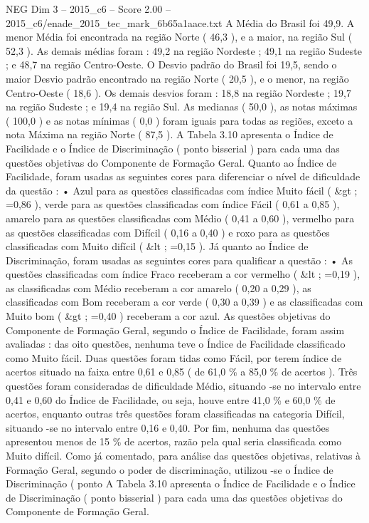 \begin{textsample}{NEG Dim 3 – 2015\_c6 – Score 2.00 – 2015\_c6/enade\_2015\_tec\_mark\_6b65a1aace.txt}
A Média do Brasil foi 49,9.
A menor Média foi encontrada na região Norte ( 46,3 ), e a maior, na região Sul ( 52,3 ).
As demais médias foram : 49,2 na região Nordeste ; 49,1 na região Sudeste ; e 48,7 na região Centro-Oeste.
O Desvio padrão do Brasil foi 19,5, sendo o maior Desvio padrão encontrado na região Norte ( 20,5 ), e o menor, na região Centro-Oeste ( 18,6 ).
Os demais desvios foram : 18,8 na região Nordeste ; 19,7 na região Sudeste ; e 19,4 na região Sul.
As medianas ( 50,0 ), as notas máximas ( 100,0 ) e as notas mínimas ( 0,0 ) foram iguais para todas as regiões, exceto a nota Máxima na região Norte ( 87,5 ).
A Tabela 3.10 apresenta o Índice de Facilidade e o Índice de Discriminação ( ponto bisserial ) para cada uma das questões objetivas do Componente de Formação Geral.
Quanto ao Índice de Facilidade, foram usadas as seguintes cores para diferenciar o nível de dificuldade da questão : • Azul para as questões classificadas com índice Muito fácil ( \&gt ; =0,86 ), verde para as questões classificadas com índice Fácil ( 0,61 a 0,85 ), amarelo para as questões classificadas com Médio ( 0,41 a 0,60 ), vermelho para as questões classificadas com Difícil ( 0,16 a 0,40 ) e roxo para as questões classificadas com Muito difícil ( \&lt ; =0,15 ).
Já quanto ao Índice de Discriminação, foram usadas as seguintes cores para qualificar a questão : • As questões classificadas com índice Fraco receberam a cor vermelho ( \&lt ; =0,19 ), as classificadas com Médio receberam a cor amarelo ( 0,20 a 0,29 ), as classificadas com Bom receberam a cor verde ( 0,30 a 0,39 ) e as classificadas com Muito bom ( \&gt ; =0,40 ) receberam a cor azul.
As questões objetivas do Componente de Formação Geral, segundo o Índice de Facilidade, foram assim avaliadas : das oito questões, nenhuma teve o Índice de Facilidade classificado como Muito fácil.
Duas questões foram tidas como Fácil, por terem índice de acertos situado na faixa entre 0,61 e 0,85 ( de 61,0 \% a 85,0 \% de acertos ).
Três questões foram consideradas de dificuldade Médio, situando -se no intervalo entre 0,41 e 0,60 do Índice de Facilidade, ou seja, houve entre 41,0 \% e 60,0 \% de acertos, enquanto outras três questões foram classificadas na categoria Difícil, situando -se no intervalo entre 0,16 e 0,40.
Por fim, nenhuma das questões apresentou menos de 15 \% de acertos, razão pela qual seria classificada como Muito difícil.
Como já comentado, para análise das questões objetivas, relativas à Formação Geral, segundo o poder de discriminação, utilizou -se o Índice de Discriminação ( ponto A Tabela 3.10 apresenta o Índice de Facilidade e o Índice de Discriminação ( ponto bisserial ) para cada uma das questões objetivas do Componente de Formação Geral.

\end{textsample}

